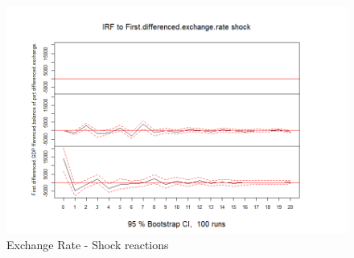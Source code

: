 \documentclass[
]{article}
\begin{document}
\begin{figure}

{\centering \includegraphics[width=0.8\linewidth]{../results/IRF_plots2/IRF_to_First.differenced.exchange.rate} 

}

\caption{Exchange Rate - Shock reactions}\label{fig:unnamed-chunk-29}
\end{figure}
\end{document}
